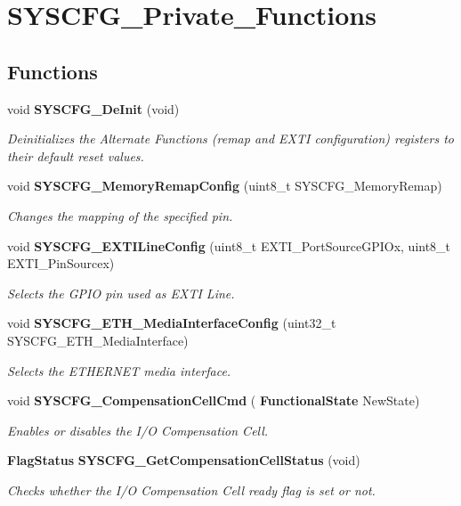 \section{S\+Y\+S\+C\+F\+G\+\_\+\+Private\+\_\+\+Functions}
\label{group__SYSCFG__Private__Functions}
\subsection*{Functions}
\begin{DoxyCompactItemize}
\item 
void \textbf{ S\+Y\+S\+C\+F\+G\+\_\+\+De\+Init} (void)
\begin{DoxyCompactList}\small\item\em Deinitializes the Alternate Functions (remap and E\+X\+TI configuration) registers to their default reset values. \end{DoxyCompactList}\item 
void \textbf{ S\+Y\+S\+C\+F\+G\+\_\+\+Memory\+Remap\+Config} (uint8\+\_\+t S\+Y\+S\+C\+F\+G\+\_\+\+Memory\+Remap)
\begin{DoxyCompactList}\small\item\em Changes the mapping of the specified pin. \end{DoxyCompactList}\item 
void \textbf{ S\+Y\+S\+C\+F\+G\+\_\+\+E\+X\+T\+I\+Line\+Config} (uint8\+\_\+t E\+X\+T\+I\+\_\+\+Port\+Source\+G\+P\+I\+Ox, uint8\+\_\+t E\+X\+T\+I\+\_\+\+Pin\+Sourcex)
\begin{DoxyCompactList}\small\item\em Selects the G\+P\+IO pin used as E\+X\+TI Line. \end{DoxyCompactList}\item 
void \textbf{ S\+Y\+S\+C\+F\+G\+\_\+\+E\+T\+H\+\_\+\+Media\+Interface\+Config} (uint32\+\_\+t S\+Y\+S\+C\+F\+G\+\_\+\+E\+T\+H\+\_\+\+Media\+Interface)
\begin{DoxyCompactList}\small\item\em Selects the E\+T\+H\+E\+R\+N\+ET media interface. \end{DoxyCompactList}\item 
void \textbf{ S\+Y\+S\+C\+F\+G\+\_\+\+Compensation\+Cell\+Cmd} (\textbf{ Functional\+State} New\+State)
\begin{DoxyCompactList}\small\item\em Enables or disables the I/O Compensation Cell. \end{DoxyCompactList}\item 
\textbf{ Flag\+Status} \textbf{ S\+Y\+S\+C\+F\+G\+\_\+\+Get\+Compensation\+Cell\+Status} (void)
\begin{DoxyCompactList}\small\item\em Checks whether the I/O Compensation Cell ready flag is set or not. \end{DoxyCompactList}\end{DoxyCompactItemize}



